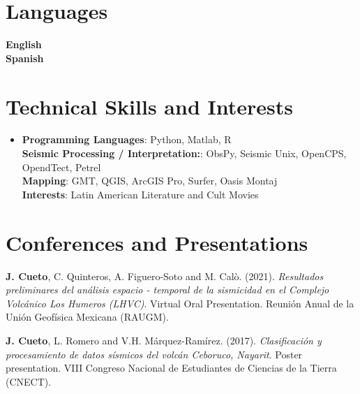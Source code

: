 \documentclass[letterpaper,11pt]{article}
\begin{document}
%
\section{Languages}
\begin{minipage}[t]{0.55\textwidth}
	
	\vspace{-0.5mm}
	\small \textbf{English} \hfill {} \SkillBull{$\bullet \bullet \bullet \bullet \, \circ$}\\
	
	\vspace{-0.5mm}
	\small \textbf{Spanish} \hfill {} \SkillBull{$\bullet \bullet \bullet \bullet \, \bullet$}
\end{minipage}

%
\section{Technical Skills and Interests}
 \begin{itemize}[leftmargin=0.15in, label={}]
    \item{
     \textbf{Programming Languages}{:  Python, Matlab, R} \\
     \textbf{Seismic Processing / Interpretation:}{: ObsPy, Seismic Unix, OpenCPS, OpendTect, Petrel} \\
     \textbf{Mapping}{: GMT, QGIS, ArcGIS Pro, Surfer, Oasis Montaj} \\
     \textbf{Interests}{: Latin American Literature and Cult Movies} \\
    }
 \end{itemize}
 \vspace{-16pt}

%
\section{Conferences and Presentations}
\begin{description}
	\raggedright
	\item {\textbf{J. Cueto}}, C. Quinteros, A. Figuero-Soto and M. Calò. (2021). {\it Resultados preliminares del análisis espacio - temporal de la sismicidad en el Complejo Volcánico Los Humeros (LHVC)}. Virtual Oral Presentation. Reunión Anual de la Unión Geofísica Mexicana (RAUGM).
	\item {\textbf{J. Cueto}}, L. Romero and V.H. Márquez-Ramírez. (2017). {\it Clasificación y procesamiento de datos sísmicos del volcán Ceboruco, Nayarit}. Poster presentation. VIII Congreso Nacional de Estudiantes de Ciencias de la Tierra (CNECT).
	\end{description}
 \vspace{-16pt}
\end{document}
